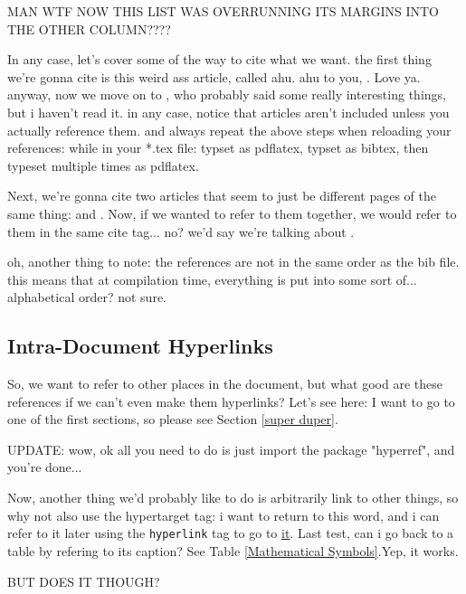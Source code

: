 \documentclass[a4paper,12pt]{article} %
\begin{document}
MAN WTF NOW THIS LIST WAS OVERRUNNING ITS MARGINS INTO THE OTHER COLUMN????

In any case, let's cover some of the way to cite what we want. the first thing we're gonna cite is this weird ass article, called ahu. ahu to you, \cite{ahu61}. Love ya. anyway, now we move on  to \cite{ab94}, who probably said some really interesting things, but i haven't read it. in any case, notice that articles aren't included unless you actually reference them. and always repeat the above steps when reloading your references: while in your *.tex file: typset as pdflatex, typset as bibtex, then typeset multiple times as pdflatex. 

Next, we're gonna cite two articles that seem to just be different pages of the same thing: \cite{m85} and \cite{m99}. Now, if we wanted to refer to them together, we would refer to them in the same cite tag... no? we'd say we're talking about \cite{m85,m99}.

oh, another thing to note: the references are not in the same order as the bib file. this means that at compilation time, everything is put into some sort of... alphabetical order? not sure.

\subsection{Intra-Document Hyperlinks}
So, we want to refer to other places in the document, but what good are these references if we can't even make them hyperlinks? Let's see here: I want to go to one of the first sections, so please see Section \ref{super duper}. 

UPDATE: wow, ok all you need to do is just import the package "hyperref", and you're done...

Now, another thing we'd probably like to do is arbitrarily link to other things, so why not also use the hypertarget tag: 
i want to return to this \hypertarget{special_word}{word}, and i can refer to it later using the \texttt{hyperlink} tag to go to \hyperlink{special_word}{it}. 
Last test, can i go back to a table by refering to its caption? See Table \ref{Mathematical Symbols}.Yep, it works.

BUT DOES IT THOUGH?








\end{document}
